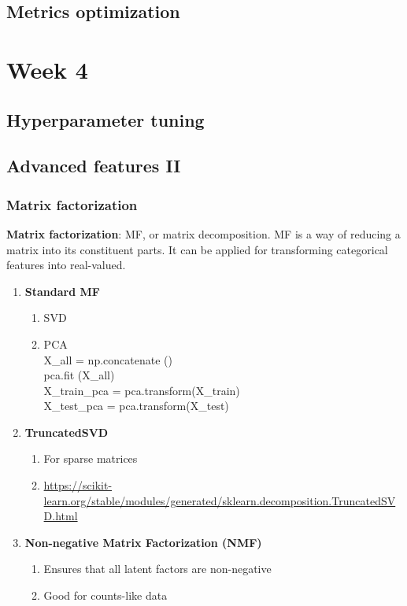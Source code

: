 \documentclass[11pt, twoside]{article}   	%
\begin{document}
\subsection{Metrics optimization}       


\pagebreak
\section{Week 4}
\subsection{Hyperparameter tuning}
\subsection{Advanced features II}
\subsubsection{Matrix factorization}
\textbf{Matrix factorization}: MF, or matrix decomposition. MF is a way of reducing a matrix into its constituent parts. It can be applied for transforming categorical features
into real-valued.

\begin{enumerate}
  \item  \textbf{Standard MF}
    \begin{enumerate}
        \item SVD
        \item PCA 
        \\X\_all = np.concatenate \big(\big)
        \\pca.fit \big(X\_all\big)
        \\X\_train\_pca = pca.transform\big(X\_train\big)
       \\X\_test\_pca = pca.transform\big(X\_test\big)
     \end{enumerate}
   \item  \textbf{TruncatedSVD}
    \begin{enumerate}
        \item For sparse matrices
        \item \url{https://scikit-learn.org/stable/modules/generated/sklearn.decomposition.TruncatedSVD.html}
     \end{enumerate}
     
   \item  \textbf{Non-negative Matrix Factorization (NMF)}
    \begin{enumerate}
        \item Ensures that all latent factors are non-negative
        \item Good for counts-like data
     \end{enumerate}
 
  \end{enumerate}
\end{document}
